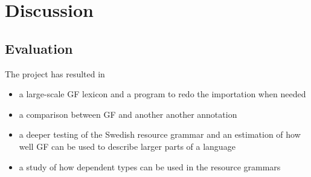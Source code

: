 \documentclass{report}
\begin{document}
\chapter{Discussion}
\label{sec:results}
\section{Evaluation}
The project has resulted in
\begin{itemize}
\item a large-scale GF lexicon and a program to redo the importation when needed
\item a comparison between GF and another another annotation
\item a deeper testing of the Swedish resource grammar and an estimation
of how well GF can be used to describe larger parts of a language
\item a study of how dependent types can be used in the resource grammars
\end{itemize}
\end{document}
